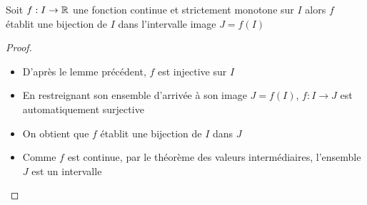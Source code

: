 \begin{frame}

\begin{lemme}
Soit $f : I \to \mathbb{R}$ une fonction continue 
et strictement monotone sur $I$ alors $f$
établit une bijection de $I$ dans l'intervalle image $J=f(I)$  
\end{lemme}

\pause

\begin{proof}
\begin{itemize}
  \item D'après le lemme précédent, $f$ est injective sur $I$
\pause  
  \item En restreignant son ensemble d'arrivée à son image $J=f(I)$,
  $f : I \to J$ est automatiquement surjective
\pause 
  \item On obtient que $f$ établit une bijection de $I$ dans $J$
\pause  
  \item Comme $f$ est continue, par le théorème des valeurs intermédiaires,
l'ensemble $J$ est un intervalle
 
\end{itemize}
  
\end{proof}

\end{frame}

